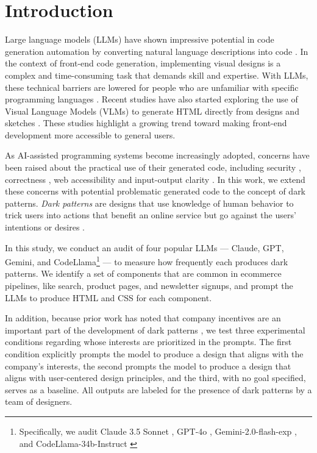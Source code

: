 \section{Introduction}

Large language models (LLMs) have shown impressive potential in code generation automation by converting natural language descriptions into code \cite{a:1}. In the context of front-end code generation, implementing visual designs is a complex and time-consuming task that demands skill and expertise. With LLMs, these technical barriers are lowered for people who are unfamiliar with specific programming languages \cite{a:2, a:30}. Recent studies have also started exploring the use of Visual Language Models (VLMs) to generate HTML directly from designs and sketches \cite{a:3, a:4}. These studies highlight a growing trend toward making front-end development more accessible to general users.

As AI-assisted programming systems become increasingly adopted, concerns have been raised about the practical use of their generated code, including security \cite{a:5}, correctness \cite{a:7}, web accessibility \cite{a:6} and input-output clarity \cite{a:8}. In this work, we extend these concerns with potential problematic generated code to the concept of dark patterns. \textit{Dark patterns} are designs that use knowledge of human behavior to trick users into actions that benefit an online service but go against the users' intentions or desires \cite{a:10, a:11}.

In this study, we conduct an audit of four popular LLMs --- Claude, GPT, Gemini, and CodeLlama\footnote{Specifically, we audit Claude 3.5 Sonnet \cite{a:58}, GPT-4o \cite{a:18}, Gemini-2.0-flash-exp \cite{a:19}, and CodeLlama-34b-Instruct \cite{a:20}} --- to measure how frequently %
each produces dark patterns. We identify a set of components that are common in ecommerce pipelines, like search, product pages, and newsletter signups, and prompt the LLMs to produce HTML and CSS for each component. 

In addition, because prior work has noted that company incentives are an important part of the development of dark patterns \cite{a:64, a:48}, we test three experimental conditions regarding whose interests are prioritized in the prompts. The first condition explicitly prompts the model to produce a design that aligns with the company's interests, the second prompts the model to produce a design that aligns with user-centered design principles, and the third, with no goal specified, serves as a baseline. All outputs are labeled for the presence of dark patterns by a team of designers.

